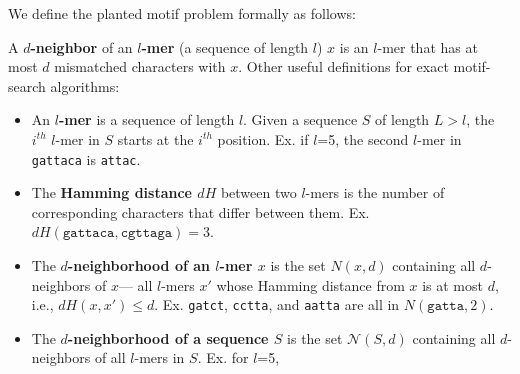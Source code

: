 \documentclass{acm_proc_article-sp}
\begin{document}
	We define the planted motif problem formally as follows:

	\noindent

	A {\boldmath \textbf{$d$-neighbor} of an \textbf{$l$-mer}} (a sequence of length $l$) $x$ is an $l$-mer that has at most $d$ mismatched characters with $x$.  Other useful definitions for exact motif-search algorithms:
		\vspace{-3mm}
		\begin{itemize}
			\small
			\item An \textbf{\boldmath $l$-mer} is a sequence of length $l$.
			Given a sequence $S$ of length $L > l$, the $i^{th}$ $l$-mer in $S$ starts at the $i^{th}$ position.
			Ex. if $l$=5, the second $l$-mer in \texttt{gattaca} is \texttt{attac}.
	
			\item The \textbf{\boldmath Hamming distance $dH$} 
			between two $l$-mers is the number of corresponding characters that differ between them.
			Ex. $dH(\texttt{gattaca}, \texttt{cgttaga}) = 3$.
	
			\item The \textbf{\boldmath $d$-neighborhood of an $l$-mer $x$}
			is the set {\boldmath $N(x, d)$} containing all $d$-neighbors of $x$---
			all $l$-mers $x'$ whose Hamming distance from $x$ is at most $d$, i.e., {\boldmath $dH (x, x') \leq d$}.
			\newline Ex. \texttt{gatct}, \texttt{cctta}, and \texttt{aatta} are all in $N(\texttt{gatta}, 2)$.
	
			\item The \textbf{\boldmath $d$-neighborhood of a sequence $S$} %
			is the set {\boldmath $\mathcal{N}(S, d)$}
			\newline containing all $d$-neighbors of all $l$-mers in $S$. Ex. for $l$=5,
			
			\end{itemize}
\end{document}

